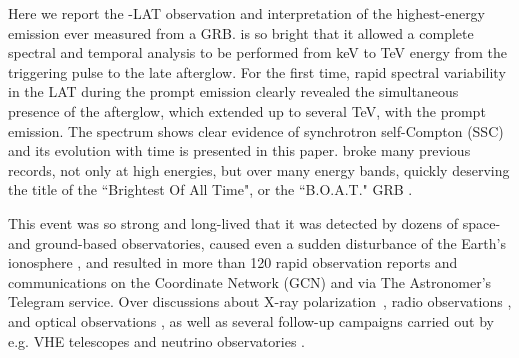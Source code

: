 \documentclass[preprint]{aastex631}
\begin{document}
Here we report the \Fermi-LAT observation and interpretation of the highest-energy emission ever measured from a GRB. \grb is so bright that it allowed a complete spectral and temporal analysis to be performed from keV to TeV energy from the triggering pulse to the late afterglow. 
For the first time, rapid spectral variability in the LAT during the prompt emission clearly revealed the simultaneous presence of the afterglow, which extended up to several TeV, with the prompt emission. The spectrum shows clear evidence of synchrotron self-Compton (SSC) and its evolution with time is presented in this paper. \grb broke many previous records, not only at high energies, but over many energy bands, quickly deserving the title of the ``Brightest Of All Time", or the ``B.O.A.T." GRB \citep{2023ApJ...946L..31B}. 

This event was so strong and long-lived that it was detected by dozens of space- and ground-based observatories, caused even a sudden disturbance of the Earth's ionosphere \citep{2022GCN.32744....1S}, and resulted in more than 120 rapid observation reports and communications on the  Coordinate Network (GCN) and via The Astronomer’s Telegram service. 
Over  discussions about X-ray polarization~\citep{IXPEpapaer}, radio observations \citep{BOAT_MW}, and optical observations \citep{Fulton_2023}, as well as several follow-up campaigns carried out by e.g. VHE telescopes \citep{Aharonian_2023} and neutrino observatories \citep{Abbasi_2023}. 
\end{document}
